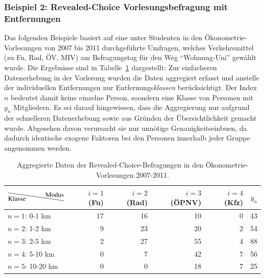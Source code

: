 \subsubsection{\label{sec:revealedChoiceEntf}Beispiel 2: 
Revealed-Choice Vorlesungsbefragung mit Entfernungen} 


Das folgenden Beispiele basiert auf eine unter Studenten
in den \"Okonometrie-Vorlesungen von 2007 bis 2011 durchgef\"uhrte
Umfragen, welches Verkehrsmittel 
(zu Fu\3, Rad, \"OV, MIV) am Befragungstag f\"ur
den Weg ``Wohnung-Uni'' gew\"ahlt wurde. Die Ergebnisse sind in 
Tabelle~\ref{tab:revealedChoiceMulti} dargestellt:
Zur einfacheren Datenerhebung in der Vorlesung  wurden die Daten aggregiert erfasst und
anstelle der individuellen 
Entfernungen nur Entfernungs\emph{klassen}
ber\"ucksichtigt. Der Index $n$ bedeutet damit keine einzelne Person,
soondern eine Klasse von Personen mit $y_n$ Mitgliedern. 
Es sei darauf hingewiesen, dass die Aggregierung  nur aufgrund der
schnelleren Datenerhebung sowie aus 
Gr\"unden der \"Ubersichtlichkeit gemacht wurde. Abgesehen davon 
verursacht sie nur unn\"otige Genauigkeitseinbu\3en, da dadurch
identische exogene Faktoren bei den Personen innerhalb jeder Gruppe
angenommen werden.
\begin{table}
\begin{center}
\begin{tabular}{|l||r|r|r|r||r|} \hline
\includegraphics[width=9em]{figsGeneric/diagonal.eps} & $i=1$ (Fu\3) & $i=2$ (Rad)  
& $i=3$ (\"OPNV)  & $i=4$ (Kfz) & $y_n$\\
\hline\hline
$n=1$: 0-1 km  & 17 & 16 & 10 & 0 & 43 \\
$n=2$: 1-2 km  & 9 & 23 & 20 & 2 & 54 \\
$n=3$: 2-5 km  & 2 & 27 & 55 & 4 & 88 \\
$n=4$: 5-10 km & 0 & 7 & 42 & 7 & 56 \\
$n=5$: 10-20 km & 0 & 0 & 18 & 7 & 25 \\
 \hline
\end{tabular}
\end{center}
\caption{\label{tab:revealedChoiceMulti}Aggregierte Daten der 
Revealed-Choice-Befragungen in den \"Okonometrie-Vorlesungen 2007-2011.}
\end{table}



